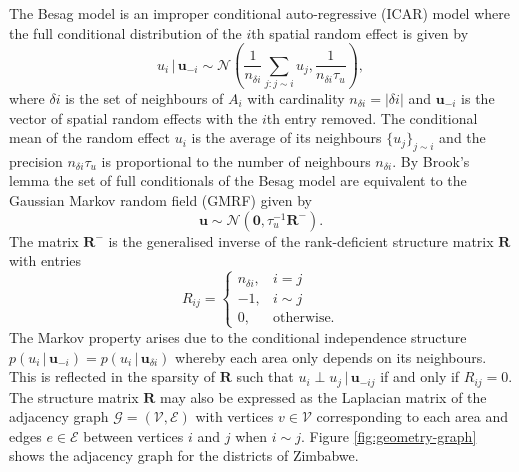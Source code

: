 \documentclass[a4paper, nobind]{templates/ociamthesis}
\begin{document}
The Besag model \autocite{besag1991bayesian} is an improper conditional auto-regressive (ICAR) model where the full conditional distribution of the \(i\)th spatial random effect is given by
\begin{equation}
    u_i \, | \, \mathbf{u}_{-i} \sim \mathcal{N} \left(\frac{1}{n_{\delta i}} \sum_{j: j \sim i} u_j, \frac{1}{n_{\delta i}\tau_u}\right), \label{eq:besag}
\end{equation}
where \(\delta i\) is the set of neighbours of \(A_i\) with cardinality \(n_{\delta i} = |\delta i|\) and \(\mathbf{u}_{-i}\) is the vector of spatial random effects with the \(i\)th entry removed.
The conditional mean of the random effect \(u_i\) is the average of its neighbours \(\{u_j\}_{j \sim i}\) and the precision \(n_{\delta i}\tau_u\) is proportional to the number of neighbours \(n_{\delta i}\).
By Brook's lemma \autocite{rue2005gaussian} the set of full conditionals of the Besag model are equivalent to the Gaussian Markov random field (GMRF) given by
\begin{equation}
    \mathbf{u} \sim \mathcal{N}(\mathbf{0}, \tau_u^{-1} \mathbf{R}^{-}). \label{eq:gmrf}
\end{equation}
The matrix \(\mathbf{R}^{-}\) is the generalised inverse of the rank-deficient structure matrix \(\mathbf{R}\) with entries
\begin{equation}
    R_{ij} =
    \begin{cases}
        n_{\delta i}, & i = j \\
        -1, & i \sim j \\
        0, & \text{otherwise.}
    \end{cases}
\end{equation}
The Markov property arises due to the conditional independence structure \(p(u_i \, | \, \mathbf{u}_{-i}) = p(u_i \, | \, \mathbf{u}_{\delta i})\) whereby each area only depends on its neighbours.
This is reflected in the sparsity of \(\mathbf{R}\) such that \(u_i \perp u_j \, | \, \mathbf{u}_{-ij}\) if and only if \(R_{ij} = 0\).
The structure matrix \(\mathbf{R}\) may also be expressed as the Laplacian matrix of the adjacency graph \(\mathcal{G} = (\mathcal{V}, \mathcal{E})\) with vertices \(v \in \mathcal{V}\) corresponding to each area and edges \(e \in \mathcal{E}\) between vertices \(i\) and \(j\) when \(i \sim j\).
Figure \ref{fig:geometry-graph} shows the adjacency graph for the districts of Zimbabwe.
\end{document}
